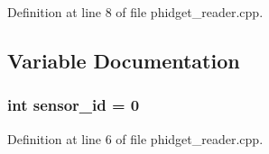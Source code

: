 Definition at line 8 of file phidget\-\_\-reader.\-cpp.



\subsection{Variable Documentation}
\subsubsection[{sensor\-\_\-id}]{\setlength{\rightskip}{0pt plus 5cm}int sensor\-\_\-id = 0}\label{phidget__reader_8cpp_a1b83cf3bbc9916bc2a4d0e75ba23b9d3}


Definition at line 6 of file phidget\-\_\-reader.\-cpp.

